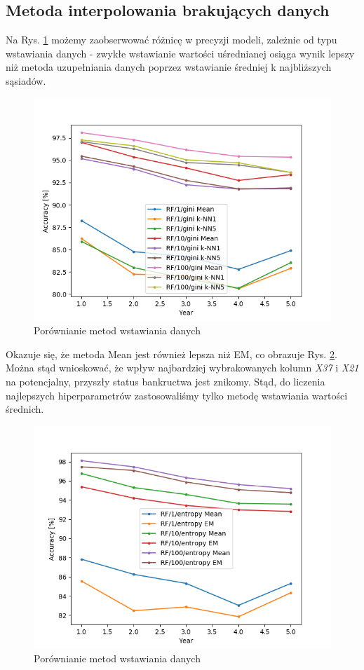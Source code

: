 \documentclass[11pt]{article}
\begin{document}
\subsection{Metoda interpolowania brakujących danych}
Na Rys. \ref{why_knn_imput_sucks} możemy zaobserwować różnicę w precyzji modeli, zależnie od typu wstawiania danych - zwykłe wstawianie wartości uśrednianej osiąga wynik lepszy niż metoda uzupełniania danych poprzez wstawianie średniej k najbliższych sąsiadów.
\begin{figure}[H]
\caption{Porównianie metod wstawiania danych}
\label{why_knn_imput_sucks}
\centering
\includegraphics[scale=0.8]{why_knn_imput_sucks}
\end{figure}
Okazuje się, że metoda Mean jest również lepsza niż EM, co obrazuje Rys. \ref{rf_varied_n_trees_entropy}. Można stąd wnioskować, że wpływ najbardziej wybrakowanych kolumn \textit{X37} i \textit{X21} na potencjalny, przyszły status bankructwa jest znikomy.
Stąd, do liczenia najlepszych hiperparametrów zastosowaliśmy tylko metodę wstawiania wartości średnich.
\begin{figure}[H]
\caption{Porównianie metod wstawiania danych}
\label{rf_varied_n_trees_entropy}
\centering
\includegraphics[scale=0.8]{rf_varied_n_trees_entropy}
\end{figure}
\end{document}
